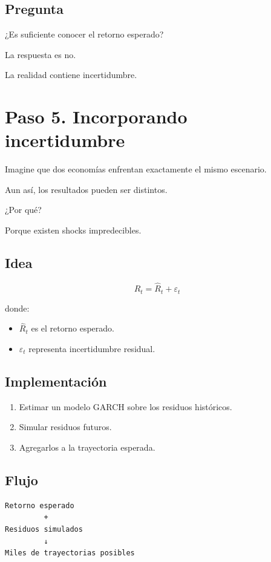 \documentclass[11pt]{article}
\begin{document}
\subsection*{Pregunta}

¿Es suficiente conocer el retorno esperado?

La respuesta es no.

La realidad contiene incertidumbre.

\section{Paso 5. Incorporando incertidumbre}

Imagine que dos economías enfrentan exactamente el mismo escenario.

Aun así, los resultados pueden ser distintos.

¿Por qué?

Porque existen shocks impredecibles.

\subsection*{Idea}

\[
R_t
=
\widehat{R}_t
+
\varepsilon_t
\]

donde:

\begin{itemize}
\item $\widehat{R}_t$ es el retorno esperado.
\item $\varepsilon_t$ representa incertidumbre residual.
\end{itemize}

\subsection*{Implementación}

\begin{enumerate}
\item Estimar un modelo GARCH sobre los residuos históricos.
\item Simular residuos futuros.
\item Agregarlos a la trayectoria esperada.
\end{enumerate}

\subsection*{Flujo}

\begin{center}
\begin{verbatim}
Retorno esperado
         +
Residuos simulados
         ↓
Miles de trayectorias posibles
\end{verbatim}
\end{center}
\end{document}
